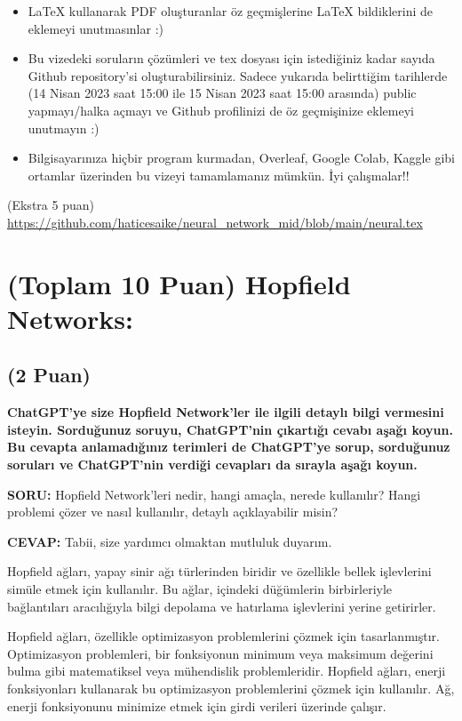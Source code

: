 \documentclass[11pt]{article}
\begin{document}
\begin{itemize}
    \item LaTeX kullanarak PDF oluşturanlar öz geçmişlerine LaTeX bildiklerini de eklemeyi unutmasınlar :)
    \item Bu vizedeki soruların çözümleri ve tex dosyası için istediğiniz kadar sayıda Github repository'si oluşturabilirsiniz. Sadece yukarıda belirttiğim tarihlerde (14 Nisan 2023 saat 15:00 ile 15 Nisan 2023 saat 15:00 arasında) public yapmayı/halka açmayı ve Github profilinizi de öz geçmişinize eklemeyi unutmayın :)
    \item Bilgisayarınıza hiçbir program kurmadan, Overleaf, Google Colab, Kaggle gibi ortamlar üzerinden bu vizeyi tamamlamanız mümkün. İyi çalışmalar!!
\end{itemize}

(Ekstra 5 puan) \url{https://github.com/haticesaike/neural_network_mid/blob/main/neural.tex}

\newpage
\section{(Toplam 10 Puan) Hopfield Networks:}

\subsection{(2 Puan)} \textbf{ChatGPT’ye size Hopfield Network’ler ile ilgili detaylı bilgi vermesini isteyin. Sorduğunuz soruyu, ChatGPT'nin çıkartığı cevabı aşağı koyun. Bu cevapta anlamadığınız terimleri de ChatGPT’ye sorup, sorduğunuz soruları ve ChatGPT’nin verdiği cevapları da sırayla aşağı koyun.}

\textbf{SORU:} Hopfield Network’leri nedir, hangi amaçla, nerede kullanılır? Hangi problemi çözer ve nasıl kullanılır, detaylı açıklayabilir misin?

\textbf{CEVAP:} Tabii, size yardımcı olmaktan mutluluk duyarım.

Hopfield ağları, yapay sinir ağı türlerinden biridir ve özellikle bellek işlevlerini simüle etmek için kullanılır. Bu ağlar, içindeki düğümlerin birbirleriyle bağlantıları aracılığıyla bilgi depolama ve hatırlama işlevlerini yerine getirirler.

Hopfield ağları, özellikle optimizasyon problemlerini çözmek için tasarlanmıştır. Optimizasyon problemleri, bir fonksiyonun minimum veya maksimum değerini bulma gibi matematiksel veya mühendislik problemleridir. Hopfield ağları, enerji fonksiyonları kullanarak bu optimizasyon problemlerini çözmek için kullanılır. Ağ, enerji fonksiyonunu minimize etmek için girdi verileri üzerinde çalışır.
\end{document}
